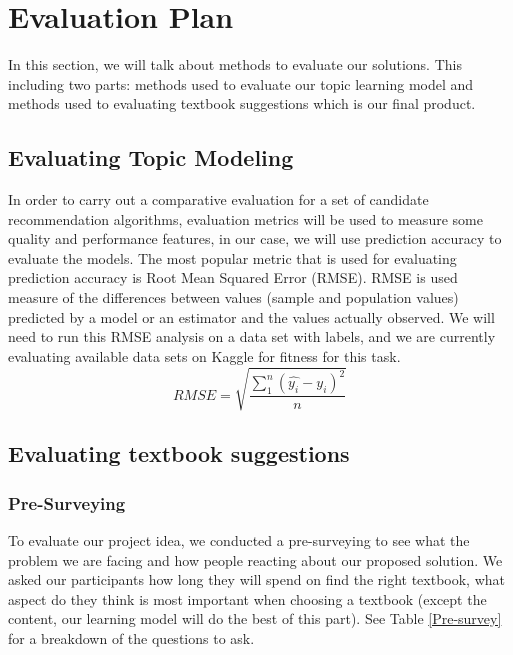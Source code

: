 
\section{Evaluation Plan}
In this section, we will talk about methods to evaluate our solutions. This including two parts: methods used to evaluate our topic learning model and methods used to evaluating textbook suggestions which is our final product. 

\subsection{Evaluating Topic Modeling}
In order to carry out a comparative evaluation for a set of candidate recommendation algorithms, evaluation metrics will be used to measure some quality and performance features, in our case, we will use prediction accuracy to evaluate the models. The most popular metric that is used for evaluating prediction accuracy is Root Mean Squared Error (RMSE). RMSE is used measure of the differences between values (sample and population values) predicted by a model or an estimator and the values actually observed.  We will need to run this RMSE analysis on a data set with labels, and we are currently evaluating available data sets on Kaggle for fitness for this task.  
\newline
\begin{equation}
   RMSE = \sqrt{\frac{\sum_{1}^{n}\left ( \widehat{y_i}-y_i \right )^{2}}{n}}
\end{equation}
   
\subsection{Evaluating textbook suggestions}
\subsubsection{Pre-Surveying}
To evaluate our project idea, we conducted a pre-surveying to see what the problem we are facing and how people reacting about our proposed solution. We asked our participants how long they will spend on find the right textbook, what aspect do they think is most important when choosing a textbook (except the content, our learning model will do the best of this part). See Table \ref{Pre-survey} for a breakdown of the questions to ask.

